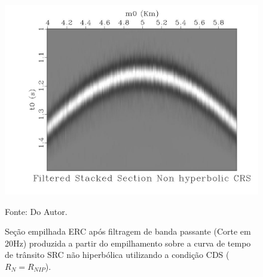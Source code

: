 \begin{figure}
\caption{Seção empilhada ERC após filtragem de banda passante (Corte em 20Hz) produzida a partir do empilhamento 
sobre a curva de tempo de trânsito SRC não hiperbólica
utilizando a condição CDS ($R_N=R_{NIP}$).}
\begin{center}
\includegraphics[scale=0.4]{images/filteredStackedSectionNcrs.jpeg}
\vspace{-0.3cm}
\end{center}
\begin{center}
 Fonte: Do Autor.
\end{center}
\label{fig:7.12}
\end{figure}
